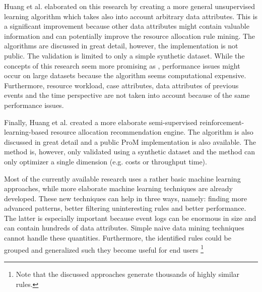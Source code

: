 Huang et al.\cite{Huang2011} elaborated on this research by creating a more general unsupervised learning algorithm which takes also into account arbitrary data attributes. This is a significant improvement because other data attributes might contain valuable information and can potentially improve the resource allocation rule mining. The algorithms are discussed in great detail, however, the implementation is not public. The validation is limited to only a simple synthetic dataset. While the concepts of this research seem more promising as \cite{Liu2012}, performance issues might occur on large datasets because the algorithm seems computational expensive. Furthermore, resource workload, case attributes, data attributes of previous events and the time perspective are not taken into account because of the same performance issues. 

Finally, Huang et al. \cite{Huang2011a} created a more elaborate semi-supervised reinforcement-learning-based resource allocation recommendation engine. The algorithm is also discussed in great detail and a public ProM implementation is also available. The method is, however, only validated using a synthetic dataset and the method can only optimizer a single dimension (e.g. costs or throughput time). 

Most of the currently available research uses a rather basic machine learning approaches, while more elaborate machine learning techniques are already developed. These new techniques can help in three ways, namely: finding more advanced patterns, better filtering uninteresting rules and better performance. The latter is especially important because event logs can be enormous in size and can contain hundreds of data attributes. Simple naive data mining techniques cannot handle these quantities. Furthermore, the identified rules could be grouped and generalized such they become useful for end users \footnote{Note that the discussed approaches generate thousands of highly similar rules.}

